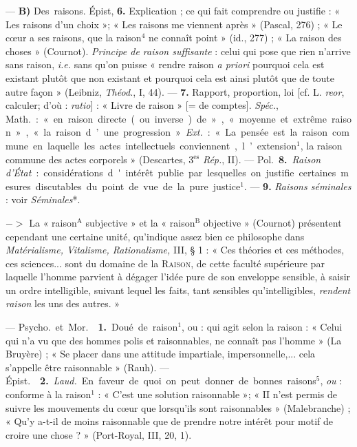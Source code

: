 \begin{itemize}[leftmargin=1cm, label=, itemsep=1pt]
— {\bf B)} \si{Des raisons}.  Épist,  {\bf 6.} Explication ;
ce qui fait comprendre ou justifie : « Les raisons d’un choix »; « Les
raisons me viennent
après » (Pascal, 276) ; « Le cœur a ses raisons, que la raison$^4$ ne connaît
point » (id., 277) ; « La raison des choses » (Cournot). {\it Principe de
raison suffisante} : celui qui pose que rien n'arrive sans raison, {\it i.e.}
sans qu'on puisse « rendre raison {\it a priori} pourquoi cela est existant
plutôt que non existant et pourquoi cela est ainsi plutôt que de toute autre
façon » (Leibniz, {\it Théod.}, I, 44). — {\bf 7.} Rapport, proportion, loi
[cf. L. {\it reor}, calculer; d’où : {\it ratio}] : « Livre de raison » [= de
comptes]. {\it Spéc.}, \si{Math.} : « en raison directe (ou inverse) de... »,
« moyenne et extrême raison », « la raison d’une progression ». {\it Ext.} :
« La pensée est la raison commune en laquelle les actes intellectuels
conviennent,... l’extension$^1$, la raison commune des actes corporels
» (Descartes, 3$^\text{es}$ {\it Rép.}, II). — \si{Pol.} {\bf 8.} {\it Raison
d'État} : considérations d'intérêt publie par lesquelles on justifie
certaines mesures discutables du point de vue de la pure justice$^1$. —
{\bf 9.} {\it Raisons séminales} : voir {\it Séminales}*.

$->$ La « raison$^\text{A}$ subjective » et la « raison$^\text{B}$ objective
» (Cournot) présentent cependant une certaine unité, qu’indique assez bien ce
philosophe dans {\it Matérialisme, Vitalisme, Rationalisme,} III, § 1 : « Ces
théories et ces méthodes, ces sciences... sont du domaine de la
\textsc{Raison}, de cette faculté supérieure par laquelle l’homme parvient à
dégager l'idée pure de son enveloppe sensible, à saisir un ordre
intelligible, suivant lequel les faits, tant sensibles qu'intelligibles, {\it
rendent raison} les uns des autres. »

 — \si{Psycho.} et \si{Mor.}  {\bf 1.} Doué de
raison$^1$, ou : qui agit selon la raison : « Celui qui n’a vu que des hommes
polis et raisonnables,
ne connaît pas l’homme » (La Bruyère) ; « Se placer dans une attitude
impartiale, impersonnelle,... cela s'appelle être raisonnable » (Rauh). —
\si{Épist.}  {\bf 2.} {\it Laud.} En faveur de quoi on peut
donner de bonnes raisons$^5$, {\it ou} : conforme à la raison$^1$ : « C’est
une solution raisonnable »; « II n’est permis de suivre les mouvements du
cœur que lorsqu’ils sont raisonnables » (Malebranche) ; « Qu’y a-t-il de
moins raisonnable que de prendre notre intérêt pour motif de croire une
chose ? » (Port-Royal, III, 20, 1).


\end{itemize}
